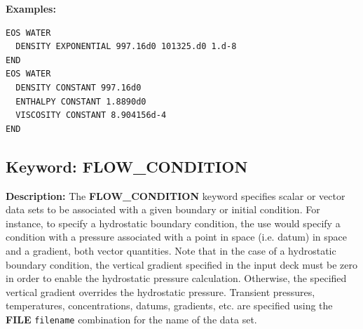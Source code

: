 \begin{mdframed}

{\noindent\bf Examples:}
\footnotesize
\begin{verbatim}
EOS WATER
  DENSITY EXPONENTIAL 997.16d0 101325.d0 1.d-8
END
EOS WATER
  DENSITY CONSTANT 997.16d0
  ENTHALPY CONSTANT 1.8890d0
  VISCOSITY CONSTANT 8.904156d-4
END
\end{verbatim}
\normalsize
\end{mdframed}

\hyperlink{target_key}{\return}


\newpage
\protect\hypertarget{target_flow_cond}{}

\subsection{Keyword: FLOW\_CONDITION}

\hfill\hyperlink{target_key}{\return}

{\noindent\bf Description:}
The {\bf FLOW\_CONDITION} keyword specifies scalar or vector data sets to be associated with a given boundary or initial condition.  For instance, to specify a hydrostatic boundary condition, the use would specify a condition with a pressure associated with a point in space (i.e. datum) in space and a gradient, both vector quantities.  Note that in the case of a hydrostatic boundary condition, the vertical gradient specified in the input deck must be zero in order to enable the hydrostatic pressure calculation.  Otherwise, the specified vertical gradient overrides the hydrostatic pressure.  Transient pressures, temperatures, concentrations, datums, gradients, etc. are specified using the {\bf FILE} {\tt filename} combination for the name of the data set.

